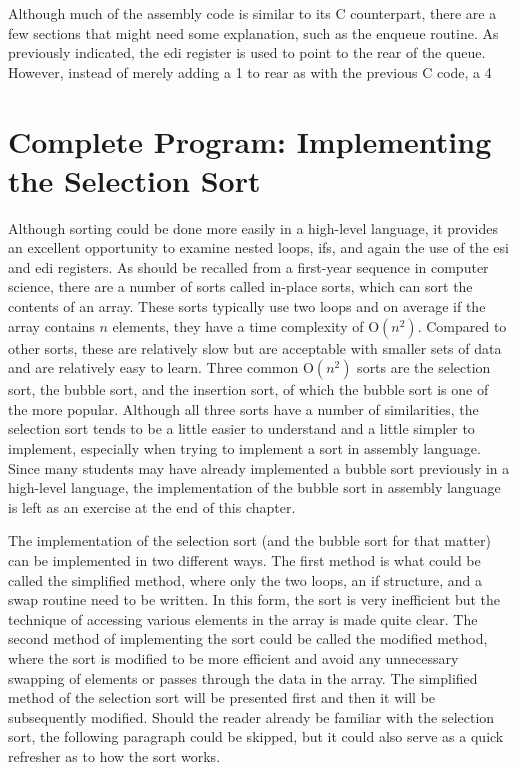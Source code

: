 \documentclass[10pt]{book}
\begin{document}
Although much of the assembly code is similar to its C counterpart, there are a few sections that might need some explanation, such as the enqueue routine. As previously indicated, the edi register is used to point to the rear of the queue. However, instead of merely adding a 1 to rear as with the previous C code, a 4
\section{Complete Program: Implementing the Selection Sort}
Although sorting could be done more easily in a high-level language, it provides an excellent opportunity to examine nested loops, ifs, and again the use of the esi and edi registers. As should be recalled from a first-year sequence in computer science, there are a number of sorts called in-place sorts, which can sort the contents of an array. These sorts typically use two loops and on average if the array contains $n$ elements, they have a time complexity of $\mathrm{O}\left(n^{2}\right)$. Compared to other sorts, these are relatively slow but are acceptable with smaller sets of data and are relatively easy to learn. Three common $\mathrm{O}\left(n^{2}\right)$ sorts are the selection sort, the bubble sort, and the insertion sort, of which the bubble sort is one of the more popular. Although all three sorts have a number of similarities, the selection sort tends to be a little easier to understand and a little simpler to implement, especially when trying to implement a sort in assembly language. Since many students may have already implemented a bubble sort previously in a high-level language, the implementation of the bubble sort in assembly language is left as an exercise at the end of this chapter.

The implementation of the selection sort (and the bubble sort for that matter) can be implemented in two different ways. The first method is what could be called the simplified method, where only the two loops, an if structure, and a swap routine need to be written. In this form, the sort is very inefficient but the technique of accessing various elements in the array is made quite clear. The second method of implementing the sort could be called the modified method, where the sort is modified to be more efficient and avoid any unnecessary swapping of elements or passes through the data in the array. The simplified method of the selection sort will be presented first and then it will be subsequently modified. Should the reader already be familiar with the selection sort, the following paragraph could be skipped, but it could also serve as a quick refresher as to how the sort works.
\end{document}
